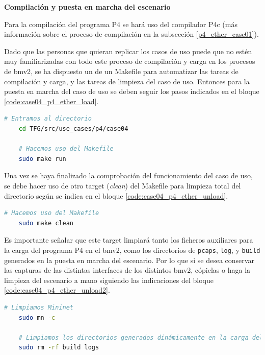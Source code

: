 \vspace{0.5cm}
\textbf{Compilación y puesta en marcha del escenario}\\
\par

Para la compilación del programa P4 se hará uso del compilador P4c (más información sobre el proceso de compilación en la subsección \ref{p4_ether_case01}).\\
\par

Dado que las personas que quieran replicar los casos de uso puede que no estén muy familiarizadas con todo este proceso de compilación y carga en los procesos de \gls{bmv2}, se ha dispuesto un de un Makefile para automatizar las tareas de compilación y carga, y las tareas de limpieza del caso de uso. Entonces para la puesta en marcha del caso de uso se deben seguir los pasos indicados en el bloque \ref{code:case04_p4_ether_load}.

\begin{lstlisting}[language= bash, style=Consola, caption={Compilación programa P4 y puesta en marcha del escenario - Case04},label=code:case04_p4_ether_load]
    # Entramos al directorio 
    cd TFG/src/use_cases/p4/case04

    # Hacemos uso del Makefile
    sudo make run
\end{lstlisting}
\vspace{0.5cm}

Una vez se haya finalizado la comprobación del funcionamiento del caso de uso, se debe hacer uso de otro target (\textit{clean}) del Makefile para limpieza total del directorio según se indica en el bloque \ref{code:case04_p4_ether_unload}.

\begin{lstlisting}[language= bash, style=Consola, caption={Limpieza del escenario P4 - Case04},label=code:case04_p4_ether_unload]
    # Hacemos uso del Makefile
    sudo make clean
\end{lstlisting}
\vspace{0.5cm}

Es importante señalar que este target limpiará tanto los ficheros auxiliares para la carga del programa P4 en el \gls{bmv2}, como los directorios de \texttt{pcaps}, \texttt{log}, y \texttt{build} generados en la puesta en marcha del escenario. Por lo que si se desea conservar las capturas de las distintas interfaces de los distintos \gls{bmv2}, cópielas o haga la limpieza del escenario a mano siguiendo las indicaciones del bloque \ref{code:case04_p4_ether_unload2}.
\begin{lstlisting}[language= bash, style=Consola, caption={Limpieza segura del escenario P4 - Case04},label=code:case04_p4_ether_unload2]
    # Limpiamos Mininet
    sudo mn -c
    
    # Limpiamos los directorios generados dinámicamente en la carga del escenario
    sudo rm -rf build logs
\end{lstlisting}


